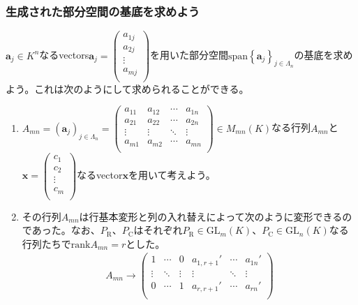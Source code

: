 \documentclass[dvipdfmx]{jsarticle}
\begin{document}
\subsubsection{生成された部分空間の基底を求めよう}%
\begin{thm}\label{2.1.8.9}
$\mathbf{a}_{j} \in K^{n}$なるvectors$\mathbf{a}_{j} = \begin{pmatrix}
a_{1j} \\
a_{2j} \\
 \vdots \\
a_{mj} \\
\end{pmatrix}$を用いた部分空間${\mathrm{span} }\left\{ \mathbf{a}_{j} \right\}_{j \in \varLambda_{n}}$の基底を求めよう。これは次のようにして求められることができる。
\begin{enumerate}
\item
  $A_{mn} = \left( \mathbf{a}_{j} \right)_{j \in \varLambda_{n}} = \begin{pmatrix}
  a_{11} & a_{12} & \cdots & a_{1n} \\
  a_{21} & a_{22} & \cdots & a_{2n} \\
   \vdots & \vdots & \ddots & \vdots \\
  a_{m1} & a_{m2} & \cdots & a_{mn} \\
  \end{pmatrix} \in M_{mn}(K)$なる行列$A_{mn}$と$\mathbf{x} = \begin{pmatrix}
  c_{1} \\
  c_{2} \\
   \vdots \\
  c_{m} \\
  \end{pmatrix}$なるvector$\mathbf{x}$を用いて考えよう。
\item
  その行列$A_{mn}$は行基本変形と列の入れ替えによって次のように変形できるのであった。なお、$P_{\mathrm{R}}$、$P_{\mathrm{C}}$はそれぞれ$P_{\mathrm{R}} \in {\mathrm{GL}}_{m}(K)$、$P_{\mathrm{C}} \in {\mathrm{GL}}_{n}(K)$なる行列たちで${\mathrm{rank}}A_{mn} = r$とした。
\begin{align*}
A_{mn} \rightarrow \begin{pmatrix}
1 & \cdots & 0 & a_{1,r + 1}' & \cdots & a_{1n}' \\
 \vdots & \ddots & \vdots & \vdots & \ddots & \vdots \\
0 & \cdots & 1 & a_{r,r + 1}' & \cdots & a_{rn}' \\

\end{pmatrix}
\end{align*}
\end{enumerate}
\end{thm}
\end{document}
